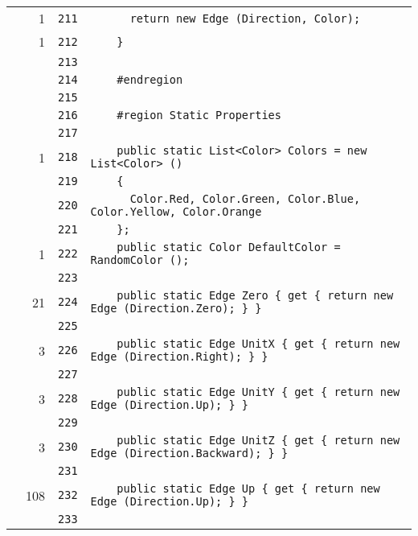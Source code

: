 \documentclass[a4paper,10pt]{article}
\begin{document}
\begin{longtable}[l]{lrrl}
\cellcolor{green} & 1 & \verb~211~ & \verb~      return new Edge (Direction, Color);~\\
\cellcolor{green} & 1 & \verb~212~ & \verb~    }~\\
\cellcolor{gray} &  & \verb~213~ & \verb~~\\
\cellcolor{gray} &  & \verb~214~ & \verb~    #endregion~\\
\cellcolor{gray} &  & \verb~215~ & \verb~~\\
\cellcolor{gray} &  & \verb~216~ & \verb~    #region Static Properties~\\
\cellcolor{gray} &  & \verb~217~ & \verb~~\\
\cellcolor{green} & 1 & \verb~218~ & \verb~    public static List<Color> Colors = new List<Color> ()~\\
\cellcolor{gray} &  & \verb~219~ & \verb~    {~\\
\cellcolor{gray} &  & \verb~220~ & \verb~      Color.Red, Color.Green, Color.Blue, Color.Yellow, Color.Orange~\\
\cellcolor{gray} &  & \verb~221~ & \verb~    };~\\
\cellcolor{green} & 1 & \verb~222~ & \verb~    public static Color DefaultColor = RandomColor ();~\\
\cellcolor{gray} &  & \verb~223~ & \verb~~\\
\cellcolor{green} & 21 & \verb~224~ & \verb~    public static Edge Zero { get { return new Edge (Direction.Zero); } }~\\
\cellcolor{gray} &  & \verb~225~ & \verb~~\\
\cellcolor{green} & 3 & \verb~226~ & \verb~    public static Edge UnitX { get { return new Edge (Direction.Right); } }~\\
\cellcolor{gray} &  & \verb~227~ & \verb~~\\
\cellcolor{green} & 3 & \verb~228~ & \verb~    public static Edge UnitY { get { return new Edge (Direction.Up); } }~\\
\cellcolor{gray} &  & \verb~229~ & \verb~~\\
\cellcolor{green} & 3 & \verb~230~ & \verb~    public static Edge UnitZ { get { return new Edge (Direction.Backward); } }~\\
\cellcolor{gray} &  & \verb~231~ & \verb~~\\
\cellcolor{green} & 108 & \verb~232~ & \verb~    public static Edge Up { get { return new Edge (Direction.Up); } }~\\
\cellcolor{gray} &  & \verb~233~ & \verb~~\\

\end{longtable}
\end{document}
